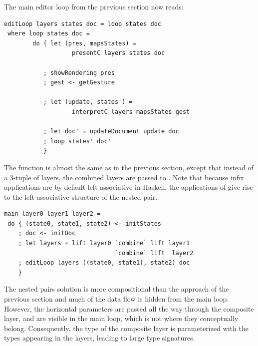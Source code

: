 \documentclass[preprint,natbib]{sigplanconf}
\begin{document}

The main editor loop from the previous section now reads:
 
\begin{small}
\begin{verbatim}
editLoop layers states doc = loop states doc
 where loop states doc = 
        do { let (pres, mapsStates) = 
                   presentC layers states doc
           
           ; showRendering pres
           ; gest <- getGesture
 
           ; let (update, states') = 
                   interpretC layers mapsStates gest
       
           ; let doc' = updateDocument update doc
           ; loop states' doc'
           }
\end{verbatim}
\end{small}

The  function is almost the same as in the previous section, except that instead of a 3-tuple of layers, the combined layers are passed to . Note that because infix applications are by default left associative in Haskell, the applications of  give rise to the left-associative structure of the nested pair.

\begin{small}
\begin{verbatim}
main layer0 layer1 layer2 = 
 do { (state0, state1, state2) <- initStates
    ; doc <- initDoc 
    ; let layers = lift layer0 `combine` lift layer1 
                               `combine` lift  layer2
    ; editLoop layers ((state0, state1), state2) doc
    }
\end{verbatim}
\end{small}



The nested pairs solution is more compositional than the approach of the previous section and much of the data flow is hidden from the main loop. However, the horizontal parameters are passed all the way through the composite layer, and are visible in the main loop, which is not where they conceptually belong. Consequently, the type of the composite layer is parameterized with the types appearing in the layers, leading to large type signatures.

\end{document}
